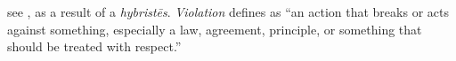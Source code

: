 \item[Sexual violation,]

see , as a result of a \emph{hybristēs}. \emph{Violation} defines as ``an action that breaks or acts against something, especially a law, agreement, principle, or something that should be treated with respect.''
